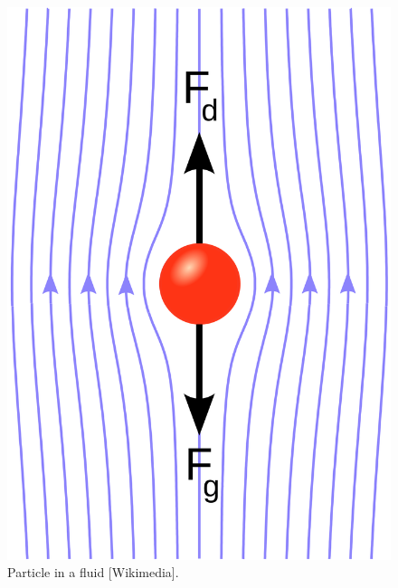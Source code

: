 \begin{figure}[!htb]
\centering
\includegraphics[width=.30\columnwidth]{images/131stokessphere}
\caption[Particle in a fluid]{Particle in a fluid [Wikimedia].}
\label{fig:131stokessphere}
\end{figure}